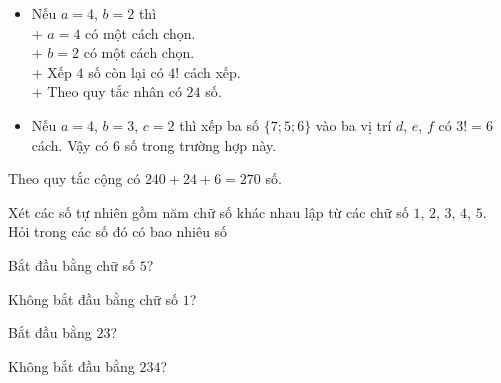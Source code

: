 \begin{bt}
{\begin{listEX}[1]
\begin{itemize}
				+ Theo quy tắc nhân có $2\cdot 5!=240$ số.
				\item Nếu $a=4$, $b=2$ thì \\
				+ $a=4$ có một cách chọn.\\
				+ $b=2$ có một cách chọn.\\
				+ Xếp $4$ số còn lại có $4!$ cách xếp.\\
				+ Theo quy tắc nhân có $24$ số.
				\item Nếu $a=4$, $b=3$, $c=2$ thì xếp ba số $\{7;5;6\}$ vào ba vị trí $d$, $e$, $f$ có $3!=6$ cách. Vậy có $6$ số trong trường hợp này.
			\end{itemize}
			\noindent Theo quy tắc cộng có $240+24+6=270$ số.	
		\end{listEX}
	}
\end{bt}
\begin{bt}%
	Xét các số tự nhiên gồm năm chữ số khác nhau lập từ các chữ số $1$, $2$, $3$, $4$, $5$. Hỏi trong các số đó có bao nhiêu số
	\begin{listEX}[2]
		\item Bắt đầu bằng chữ số $5$?
		\item Không bắt đầu bằng chữ số $1$?
		\item Bắt đầu bằng $23$?
		\item Không bắt đầu bằng $234$?
	\end{listEX}
\end{bt}
